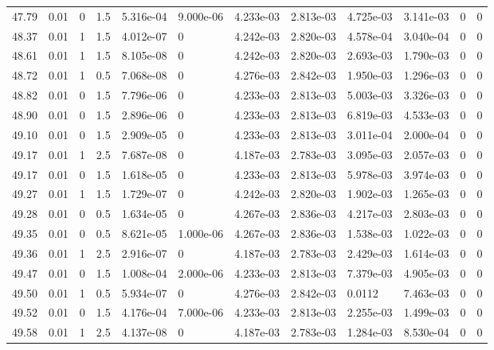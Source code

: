 \documentclass[preview]{standalone}
\begin{document}
{{{{{{{\begin{tabular}{L{1.2cm}C{1.2cm} C{0.3cm}C{0.5cm} C{1.4cm}C{1.4cm} C{1.4cm}C{1.4cm} C{1.6cm}C{1.6cm} C{1.6cm}C{1.6cm}}
  47.79  &  0.01  & 0     & 1.5 &  5.316e-04  & 9.000e-06  &  4.233e-03&   2.813e-03& 4.725e-03 & 3.141e-03   &  0 & 0  \\ 
  48.37  &  0.01  & 1     & 1.5 &  4.012e-07  & 0  &  4.242e-03&   2.820e-03& 4.578e-04 & 3.040e-04   &  0 & 0  \\ 
  48.61  &  0.01  & 1     & 1.5 &  8.105e-08  & 0  &  4.242e-03&   2.820e-03& 2.693e-03 & 1.790e-03   &  0 & 0  \\ 
  48.72  &  0.01  & 1     & 0.5 &  7.068e-08  & 0  &  4.276e-03&   2.842e-03& 1.950e-03 & 1.296e-03   &  0 & 0  \\ 
  48.82  &  0.01  & 0     & 1.5 &  7.796e-06  & 0  &  4.233e-03&   2.813e-03& 5.003e-03 & 3.326e-03   &  0 & 0  \\ 
  48.90  &  0.01  & 0     & 1.5 &  2.896e-06  & 0  &  4.233e-03&   2.813e-03& 6.819e-03 & 4.533e-03   &  0 & 0  \\ 
  49.10  &  0.01  & 0     & 1.5 &  2.909e-05  & 0  &  4.233e-03&   2.813e-03& 3.011e-04 & 2.000e-04   &  0 & 0  \\ 
  49.17  &  0.01  & 1     & 2.5 &  7.687e-08  & 0  &  4.187e-03&   2.783e-03& 3.095e-03 & 2.057e-03   &  0 & 0  \\ 
  49.17  &  0.01  & 0     & 1.5 &  1.618e-05  & 0  &  4.233e-03&   2.813e-03& 5.978e-03 & 3.974e-03   &  0 & 0  \\ 
  49.27  &  0.01  & 1     & 1.5 &  1.729e-07  & 0  &  4.242e-03&   2.820e-03& 1.902e-03 & 1.265e-03   &  0 & 0  \\ 
  49.28  &  0.01  & 0     & 0.5 &  1.634e-05  & 0  &  4.267e-03&   2.836e-03& 4.217e-03 & 2.803e-03   &  0 & 0  \\ 
  49.35  &  0.01  & 0     & 0.5 &  8.621e-05  & 1.000e-06  &  4.267e-03&   2.836e-03& 1.538e-03 & 1.022e-03   &  0 & 0  \\ 
  49.36  &  0.01  & 1     & 2.5 &  2.916e-07  & 0  &  4.187e-03&   2.783e-03& 2.429e-03 & 1.614e-03   &  0 & 0  \\ 
  49.47  &  0.01  & 0     & 1.5 &  1.008e-04  & 2.000e-06  &  4.233e-03&   2.813e-03& 7.379e-03 & 4.905e-03   &  0 & 0  \\ 
  49.50  &  0.01  & 1     & 0.5 &  5.934e-07  & 0  &  4.276e-03&   2.842e-03& 0.0112 & 7.463e-03   &  0 & 0  \\ 
  49.52  &  0.01  & 0     & 1.5 &  4.176e-04  & 7.000e-06  &  4.233e-03&   2.813e-03& 2.255e-03 & 1.499e-03   &  0 & 0  \\ 
  49.58  &  0.01  & 1     & 2.5 &  4.137e-08  & 0  &  4.187e-03&   2.783e-03& 1.284e-03 & 8.530e-04   &  0 & 0  \\ 

\end{tabular}}}}}}}}
\end{document}
